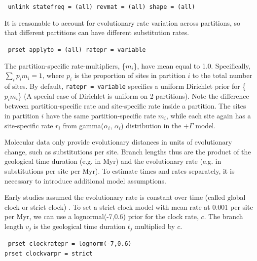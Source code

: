 \documentclass[12pt]{article}
\begin{document}
\medskip
{\tt \color{red} \noindent
unlink statefreq = (all) revmat = (all) shape = (all)
}
\medskip

It is reasonable to account for evolutionary rate variation across partitions, so that different partitions can have different substitution rates.

\medskip
{\tt \color{red} \noindent
prset applyto = (all) ratepr = variable
}
\medskip

\noindent The partition-specific rate-multipliers, \{$m_i$\}, have mean equal to 1.0.
Specifically, $\sum_i p_i m_i = 1$, where $p_i$ is the proportion of sites in partition $i$ to the total number of sites.
By default, {\tt ratepr = variable} specifies a uniform Dirichlet prior for \{$p_i m_i$\} (A special case of Dirichlet is uniform on 2 partitions).
Note the difference between partition-specific rate and site-specific rate inside a partition. The sites in partition $i$ have the same partition-specific rate $m_i$, while each site again has a site-specific rate $r_i$ from gamma($\alpha_i$, $\alpha_i$) distribution in the $+\Gamma$ model.


Molecular data only provide evolutionary distances in units of evolutionary change, such as substitutions per site.
Branch lengths thus are the product of the geological time duration (e.g. in Myr) and the evolutionary rate (e.g. in substitutions per site per Myr).
To estimate times and rates separately, it is necessary to introduce additional model assumptions.

Early studies assumed the evolutionary rate is constant over time (called global clock or strict clock) \citep{Zuckerkandl:1965vq}.
To set a strict clock model with mean rate at 0.001 per site per Myr, we can use a lognormal(-7,0.6) prior for the clock rate, $c$.
The branch length $v_j$ is the geological time duration $t_j$ multiplied by $c$.

\medskip
{\tt \color{red} \noindent
prset clockratepr = lognorm(-7,0.6) \\
prset clockvarpr = strict
}
\medskip
\end{document}
